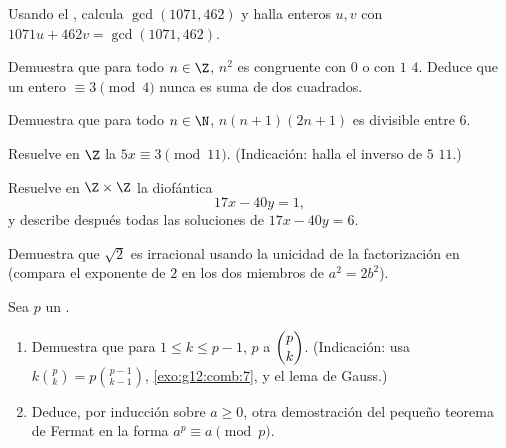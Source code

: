 \begin{exercise}[$\star$]\label{exo:g12:arith:3}
Usando el , calcula $\gcd(1071, 462)$ y halla enteros
$u, v$ con $1071u + 462v = \gcd(1071, 462)$.
\end{exercise}

\begin{exercise}[$\star$]\label{exo:g12:arith:4}
Demuestra que para todo $n \in \Z$, $n^2$ es congruente con $0$ o con $1$
 $4$. Deduce que un entero $\equiv 3 \pmod 4$ nunca es suma de dos
cuadrados.
\end{exercise}

\begin{exercise}[$\star\star$]\label{exo:g12:arith:5}
Demuestra que para todo $n \in \N$, $n(n+1)(2n+1)$ es divisible entre $6$.
\end{exercise}

\begin{exercise}[$\star\star$]\label{exo:g12:arith:6}
Resuelve en $\Z$ la  $5x \equiv 3 \pmod{11}$. (Indicación: halla
el inverso de $5$  $11$.)
\end{exercise}

\begin{exercise}[$\star\star$]\label{exo:g12:arith:7}
Resuelve en $\Z \times \Z$ la  diofántica
\[
17x - 40y = 1,
\]
y describe después todas las soluciones de $17x - 40y = 6$.
\end{exercise}

\begin{exercise}[$\star\star$]\label{exo:g12:arith:8}
Demuestra que $\sqrt2$ es irracional usando la unicidad de la factorización
en  (compara el exponente de $2$ en los dos miembros de
$a^2 = 2b^2$).
\end{exercise}

\begin{exercise}[$\star\star\star$]\label{exo:g12:arith:9}
Sea $p$ un .
\begin{enumerate}
  \item Demuestra que para $1 \leq k \leq p - 1$, $p$  a
        $\dbinom{p}{k}$. (Indicación: usa
        $k\binom pk = p\binom{p-1}{k-1}$, \cref{exo:g12:comb:7}, y el lema
        de Gauss.)
  \item Deduce, por inducción sobre $a \geq 0$, otra demostración del
        pequeño teorema de Fermat en la forma $a^p \equiv a \pmod p$.
\end{enumerate}
\end{exercise}

